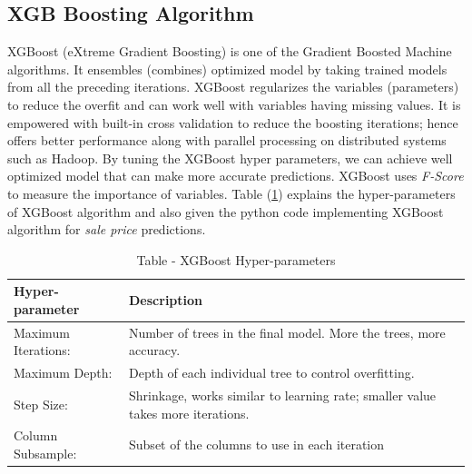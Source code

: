 \documentclass[sigconf]{acmart}
\begin{document}
	\subsection{XGB Boosting Algorithm}

	XGBoost (eXtreme Gradient Boosting) is one of the Gradient Boosted Machine algorithms. It ensembles (combines) optimized model by taking trained models from all the preceding iterations. XGBoost regularizes the variables (parameters) to reduce the overfit and can work well with variables having missing values. It is empowered with built-in cross validation to reduce the boosting iterations; hence offers better performance along with parallel processing on distributed systems such as Hadoop. By tuning the XGBoost hyper parameters, we can achieve well optimized model that can make more accurate predictions. XGBoost uses {\em F-Score} to measure the importance of  variables. Table (\ref{tab:xgb-param}) explains the hyper-parameters of XGBoost algorithm and also given the python code implementing XGBoost algorithm for {\em sale price} predictions.
	
	\begin{table}[htb]
		\center
		\caption{Table - XGBoost Hyper-parameters}
		\label{tab:xgb-param}		
		\begin{tabular}{l p{5cm}}
			\toprule
			Hyper-parameter & Description \\
			\midrule
			Maximum Iterations: & Number of trees in the final model. More the trees, more accuracy. \\
			
			Maximum Depth: & Depth of each individual tree to control overfitting. \\
			
			Step Size: & Shrinkage, works similar to learning rate; smaller value takes more iterations. \\
			
			Column Subsample: & Subset of the columns to use in each iteration \\ 
			\bottomrule
		\end{tabular}
	\end{table}
	
\end{document}
